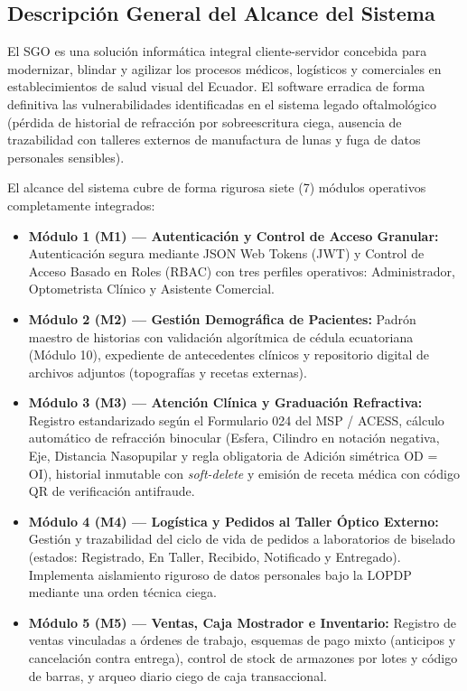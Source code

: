 \documentclass[12pt,a4paper]{report}
\begin{document}
\subsection{Descripción General del Alcance del Sistema}
El SGO es una solución informática integral cliente-servidor concebida para modernizar, blindar y agilizar los procesos médicos, logísticos y comerciales en establecimientos de salud visual del Ecuador. El software erradica de forma definitiva las vulnerabilidades identificadas en el sistema legado oftalmológico (pérdida de historial de refracción por sobreescritura ciega, ausencia de trazabilidad con talleres externos de manufactura de lunas y fuga de datos personales sensibles).

El alcance del sistema cubre de forma rigurosa siete (7) módulos operativos completamente integrados:
\begin{itemize}
    \item \textbf{Módulo 1 (M1) --- Autenticación y Control de Acceso Granular:} Autenticación segura mediante JSON Web Tokens (JWT) y Control de Acceso Basado en Roles (RBAC) con tres perfiles operativos: Administrador, Optometrista Clínico y Asistente Comercial.
    \item \textbf{Módulo 2 (M2) --- Gestión Demográfica de Pacientes:} Padrón maestro de historias con validación algorítmica de cédula ecuatoriana (Módulo 10), expediente de antecedentes clínicos y repositorio digital de archivos adjuntos (topografías y recetas externas).
    \item \textbf{Módulo 3 (M3) --- Atención Clínica y Graduación Refractiva:} Registro estandarizado según el Formulario 024 del MSP / ACESS, cálculo automático de refracción binocular (Esfera, Cilindro en notación negativa, Eje, Distancia Nasopupilar y regla obligatoria de Adición simétrica OD = OI), historial inmutable con \textit{soft-delete} y emisión de receta médica con código QR de verificación antifraude.
    \item \textbf{Módulo 4 (M4) --- Logística y Pedidos al Taller Óptico Externo:} Gestión y trazabilidad del ciclo de vida de pedidos a laboratorios de biselado (estados: Registrado, En Taller, Recibido, Notificado y Entregado). Implementa aislamiento riguroso de datos personales bajo la LOPDP mediante una orden técnica ciega.
    \item \textbf{Módulo 5 (M5) --- Ventas, Caja Mostrador e Inventario:} Registro de ventas vinculadas a órdenes de trabajo, esquemas de pago mixto (anticipos y cancelación contra entrega), control de stock de armazones por lotes y código de barras, y arqueo diario ciego de caja transaccional.

\end{itemize}
\end{document}
